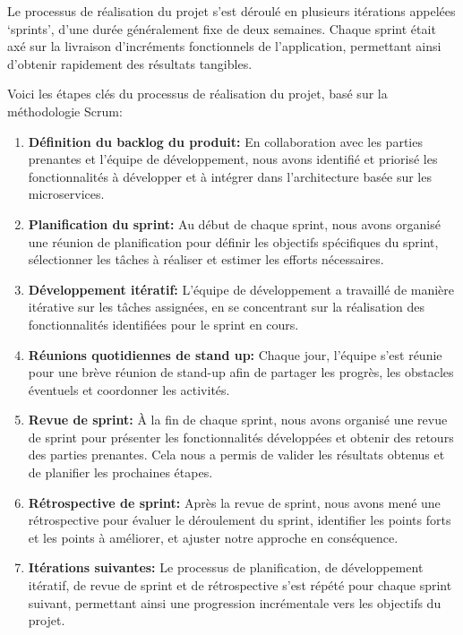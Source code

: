 Le processus de réalisation du projet s'est déroulé en plusieurs itérations appelées `sprints', d'une durée généralement fixe de deux semaines. Chaque sprint était axé sur la livraison d'incréments fonctionnels de l'application, permettant ainsi d'obtenir rapidement des résultats tangibles.

Voici les étapes clés du processus de réalisation du projet, basé sur la méthodologie Scrum:

\begin{enumerate}
    \item \textbf{Définition du backlog du produit:} En collaboration avec les parties prenantes et l'équipe de développement, nous avons identifié et priorisé les fonctionnalités à développer et à intégrer dans l'architecture basée sur les microservices.
    \item \textbf{Planification du sprint:} Au début de chaque sprint, nous avons organisé une réunion de planification pour définir les objectifs spécifiques du sprint, sélectionner les tâches à réaliser et estimer les efforts nécessaires.
    \item \textbf{Développement itératif:} L'équipe de développement a travaillé de manière itérative sur les tâches assignées, en se concentrant sur la réalisation des fonctionnalités identifiées pour le sprint en cours.
    \item \textbf{Réunions quotidiennes de stand up:} Chaque jour, l'équipe s'est réunie pour une brève réunion de stand-up afin de partager les progrès, les obstacles éventuels et coordonner les activités.
    \item \textbf{Revue de sprint:} À la fin de chaque sprint, nous avons organisé une revue de sprint pour présenter les fonctionnalités développées et obtenir des retours des parties prenantes. Cela nous a permis de valider les résultats obtenus et de planifier les prochaines étapes.
    \item \textbf{Rétrospective de sprint:} Après la revue de sprint, nous avons mené une rétrospective pour évaluer le déroulement du sprint, identifier les points forts et les points à améliorer, et ajuster notre approche en conséquence.
    \item \textbf{Itérations suivantes:} Le processus de planification, de développement itératif, de revue de sprint et de rétrospective s'est répété pour chaque sprint suivant, permettant ainsi une progression incrémentale vers les objectifs du projet.
\end{enumerate}

